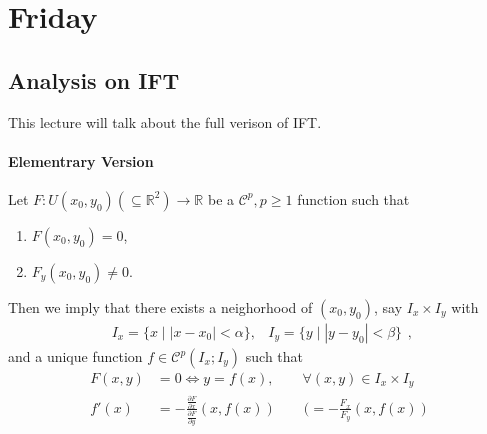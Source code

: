 
\section{Friday}
\subsection{Analysis on IFT}
This lecture will talk about the full verison of IFT.
\paragraph{Elementrary Version}
Let $F: U(x_0,y_0)(\subseteq\mathbb{R}^2)\to\mathbb{R}$ be a $\mathcal{C}^p, p\ge1$ function such that
\begin{enumerate}
\item
$F(x_0,y_0)=0$,
\item
$F_y(x_0,y_0)\ne0$.
\end{enumerate}
Then we imply that there exists a neighorhood of $(x_0,y_0)$, say $I_x\times I_y$ with
\[
\begin{array}{ll}
I_x=\{x\mid |x-x_0|<\alpha\},
&
I_y=\{y\mid |y-y_0|<\beta\}
\end{array},
\]
and a unique function $f\in\mathcal{C}^p(I_x;I_y)$ such that
\begin{align*}
F(x,y)&=0\Longleftrightarrow
y=f(x),\qquad
\forall (x,y)\in I_x\times I_y\label{Eq:11:2}\\
f'(x)&=-\frac{\frac{\partial F}{\partial x}}{\frac{\partial F}{\partial y}}(x,f(x))\qquad (=-\frac{F_x}{F_y}(x,f(x))
\end{align*}


